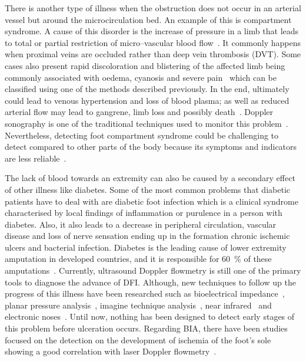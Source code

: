   
There is another type of illness when the obstruction does not occur in an arterial vessel but around the microcirculation bed. An example of this is compartment syndrome. A cause of this disorder is the increase of pressure in a limb that leads to total or partial restriction of micro–vascular blood flow~\cite{songer2001tissue}. It commonly happens when proximal veins are occluded rather than deep vein thrombosis (DVT). Some cases also present rapid discoloration and blistering of the affected limb being commonly associated with oedema, cyanosis and severe pain~\cite{chhabra2013compartment} which can be classified using one of the methods described previously. In the end, ultimately could lead to venous hypertension and loss of blood plasma; as well as reduced arterial flow may lead to gangrene, limb loss and possibly death~\cite{lamborn2014compartment}. Doppler sonography is one of the traditional techniques used to monitor this problem~\cite{chhabra2013compartment}. Nevertheless, detecting foot compartment syndrome could be challenging to detect compared to other parts of the body because its symptoms and indicators are less reliable~\cite{dodd2013foot}.  

The lack of blood towards an extremity can also be caused by a secondary effect of other illness like diabetes. Some of the most common problems that diabetic patients have to deal with are diabetic foot infection which is a clinical syndrome characterised by local findings of inflammation or purulence in a person with diabetes. Also, it also leads to a decrease in peripheral circulation, vascular disease and loss of nerve sensation ending up in the formation chronic ischemic ulcers and bacterial infection. Diabetes is the leading cause of lower extremity amputation in developed countries, and it is responsible for \SI{60}{\percent} of these amputations~\cite{ucckay2014diabetic}.  Currently, ultrasound Doppler flowmetry is still one of the primary tools to diagnose the advance of DFI. Although, new techniques to follow up the progress of this illness have been researched such as bioelectrical impedance~\cite{cheng2012application}, planar pressure analysis~\cite{dos2010insole}, imagine technique analysis~\cite{songer2001tissue}, near infrared~\cite{papazoglou2008assessment} and electronic noses~\cite{yusuf2013diagnosis}. Until now, nothing has been designed to detect early stages of this problem before ulceration occurs. Regarding BIA, there have been studies focused on the detection on the development of ischemia of the foot's sole showing a good correlation with laser Doppler flowmetry~\cite{cheng2012application}. 


